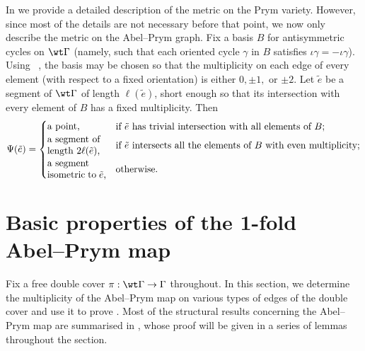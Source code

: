 In  we  provide a detailed description of the metric on the Prym variety. However, since most of the details are not necessary before that point, we now only describe the metric  on the Abel--Prym graph. Fix a basis $B$ for antisymmetric cycles on $\wt\Gamma$ (namely, such that each oriented cycle  $\gamma$ in $B$ satisfies $\iota\gamma = -\iota\gamma$). Using ~\cite[Construction B]{LZ22}, the basis may be chosen so that the multiplicity on each edge of every element  (with respect to a fixed orientation) is either $0,\pm 1,$ or  $\pm 2$.  Let $\tilde e$ be a segment of $\wt\Gamma$ of length $\ell(\tilde e)$, short enough so that its  intersection with every element of $B$ has a fixed multiplicity. Then 
\begin{equation}\label{eq:PrymMetric}
\Psi(\tilde e) = 
\begin{cases}
 \text{\parbox{0.85in}{a point,}} & \text{if $\tilde e$ has trivial intersection with all elements of $B$;} \\[2pt]

 \text{\parbox{0.85in}{a segment of \\ length $2\ell(\tilde e)$,}} & \text{if $\tilde e$ intersects all the elements of $B$ with even multiplicity;}\\[8pt]

 \text{\parbox{0.85in}{a segment \\ isometric to $\tilde e$,}} & \text{otherwise.}
 
\end{cases}
\end{equation}

\section{Basic properties  of the 1-fold Abel--Prym map}
\label{sec:behaviourofAP}

Fix a free double cover $\pi:\wt\Gamma\to\Gamma$ throughout. 
In this section, we determine the  multiplicity of the Abel--Prym map on various types of edges of the double cover and use it to prove . Most of the structural results concerning the Abel--Prym map are summarised in 
, whose proof will be given in a series of lemmas throughout the section. 
 
